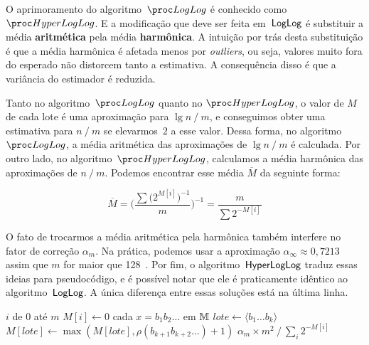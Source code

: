 O aprimoramento do algoritmo~$\LOG$ é conhecido como $\HLOG$. E a modificação que deve ser feita em~$\textsf{LogLog}$ é 
substituir a média \textbf{aritmética} pela média \textbf{harmônica}. A intuição por trás desta substituição é que a 
média harmônica é afetada menos por \textit{outliers}, ou seja, valores muito fora do esperado não distorcem tanto a 
estimativa. A consequência disso é que a variância do estimador é reduzida. 

Tanto no algoritmo~$\LOG$ quanto no $\HLOG$, o valor de $M$ de cada lote é uma aproximação para $\lg n \mathbin{/} m$, e 
conseguimos obter uma estimativa para $n \mathbin{/} m$ se elevarmos~$2$ a esse valor. Dessa forma, no algoritmo~$\LOG$, 
a média aritmética das aproximações de $\lg n \mathbin{/} m$ é calculada. Por outro lado, no algoritmo~$\HLOG$, 
calculamos a média harmônica das aproximações de $n \mathbin{/} m$. Podemos encontrar esse média $\overline{M}$ da 
seguinte forma:

\[ \overline{M} = \bigg(\frac{\sum\big(2^{M[i]}\big)^{-1}}{m}\bigg)^{-1} = \frac{m}{\sum2^{-M[i]}} \]

O fato de trocarmos a média aritmética pela harmônica também interfere no fator de correção $\alpha_m$. Na prática, 
podemos usar a aproximação $\alpha_{\infty} \approx 0{,}7213$ assim que $m$ for maior que 128~\citep{HyperLogLogWiki}.
Por fim, o algoritmo~$\textsf{HyperLogLog}$ traduz essas ideias para pseudocódigo, e é possível notar que ele é praticamente 
idêntico ao algoritmo~$\textsf{LogLog}$. A única diferença entre essas soluções está na última linha.

\begin{codebox}
      \li \For $i$ de $0$ até $m$
            \Do
      \li   $M[i] \gets 0$
            \End
      \li \For cada $x = b_1b_2{\dots}$ em $\mathbb{M}$ 
            \Do
      \li   $lote \gets \langle b_1 {\dots} b_k \rangle$
      \li   $M[lote] \gets \max(M[lote], \rho(b_{k+1}b_{k+2}{\dots}) + 1)$
            \End
      \li
      \Return $\alpha_m \times m^2 \mathbin{/} \sum_i{2^{-M[i]}}$   
      \End
\end{codebox}